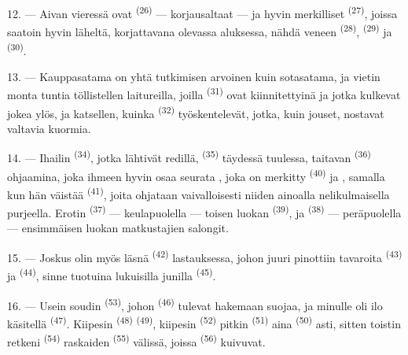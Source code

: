 12. --- Aivan vieressä ovat  \textsuperscript{(26)} ---
korjausaltaat --- ja hyvin merkilliset 
\textsuperscript{(27)}, joissa saatoin hyvin läheltä, korjattavana olevassa
aluksessa, nähdä veneen  \textsuperscript{(28)},
 \textsuperscript{(29)} ja 
\textsuperscript{(30)}.

13. --- Kauppasatama on yhtä tutkimisen arvoinen kuin sotasatama, ja vietin monta
tuntia töllistellen laitureilla, joilla 
\textsuperscript{(31)} ovat kiinnitettyinä ja jotka kulkevat jokea ylös, ja
katsellen, kuinka  \textsuperscript{(32)}
työskentelevät, jotka, kuin jouset, nostavat valtavia kuormia.

\VUsaut{4.0mm}
\VUsaut{3.0mm}

14. --- Ihailin  \textsuperscript{(34)}, jotka lähtivät
redillä,  \textsuperscript{(35)} täydessä tuulessa, taitavan
 \textsuperscript{(36)} ohjaamina, joka ihmeen hyvin osaa
seurata , joka on merkitty 
\textsuperscript{(40)} ja , samalla kun hän väistää
 \textsuperscript{(41)}, joita ohjataan vaivalloisesti niiden
ainoalla nelikulmaisella purjeella. Erotin 
\textsuperscript{(37)} --- keulapuolella --- toisen luokan 
\textsuperscript{(39)}, ja  \textsuperscript{(38)} ---
peräpuolella --- ensimmäisen luokan matkustajien salongit.

15. --- Joskus olin myös läsnä  \textsuperscript{(42)}
lastauksessa, johon juuri pinottiin tavaroita 
\textsuperscript{(43)} ja  \textsuperscript{(44)},
sinne tuotuina lukuisilla junilla 
\textsuperscript{(45)}.

\VUsaut{3.0mm}
\VUsaut{3.0mm}

16. --- Usein soudin  \textsuperscript{(53)}, johon
 \textsuperscript{(46)} tulevat hakemaan suojaa, ja minulle oli
ilo käsitellä  \textsuperscript{(47)}. Kiipesin
 \textsuperscript{(48)} 
\textsuperscript{(49)}, kiipesin  \textsuperscript{(52)} pitkin
 \textsuperscript{(51)} aina 
\textsuperscript{(50)} asti, sitten toistin retkeni 
\textsuperscript{(54)} raskaiden 
\textsuperscript{(55)} välissä, joissa  \textsuperscript{(56)}
kuivuvat.

